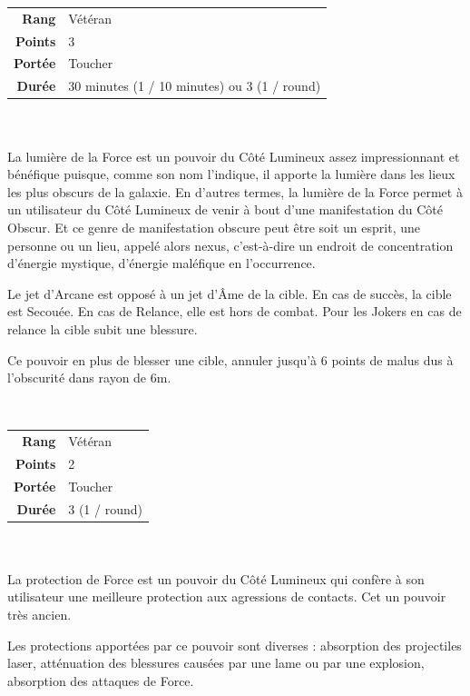 \begin{description}[align=left]
        \begin{tabular}{ r l }
            \textbf{Rang}    & Vétéran \\
            \textbf{Points}  & 3 \\
            \textbf{Portée}  & Toucher \\
            \textbf{Durée}   & 30 minutes (1 / 10 minutes) ou 3 (1 / round) \\
        \end{tabular}
        \\ \\
        La lumière de la Force est un pouvoir du Côté Lumineux assez impressionnant et bénéfique puisque, comme son nom l’indique, il apporte la lumière dans les lieux les plus obscurs de la galaxie. En d’autres termes, la lumière de la Force permet à un utilisateur du Côté Lumineux de venir à bout d’une manifestation du Côté Obscur. Et ce genre de manifestation obscure peut être soit un esprit, une personne ou un lieu, appelé alors nexus, c’est-à-dire un endroit de concentration d’énergie mystique, d’énergie maléfique en l’occurrence.

        Le jet d’Arcane est opposé à un jet d’\^Ame de la cible. En cas de succès, la cible est Secouée. En cas de Relance, elle est hors de combat. Pour les Jokers en cas de relance la cible subit une blessure.

        Ce pouvoir en plus de blesser une cible, annuler jusqu’à 6 points de malus dus à l’obscurité dans rayon de 6m.
        \\

    \item [Protection de Force] ~ \\

        \begin{tabular}{ r l }
            \textbf{Rang}    & Vétéran \\
            \textbf{Points}  & 2 \\
            \textbf{Portée}  & Toucher \\
            \textbf{Durée}   & 3 (1 / round) \\
        \end{tabular}
        \\ \\
        La protection de Force est un pouvoir du Côté Lumineux qui confère à son utilisateur une meilleure protection aux agressions de contacts. Cet un pouvoir très ancien.

        Les protections apportées par ce pouvoir sont diverses : absorption des projectiles laser, atténuation des blessures causées par une lame ou par une explosion, absorption des attaques de Force.


\end{description}
